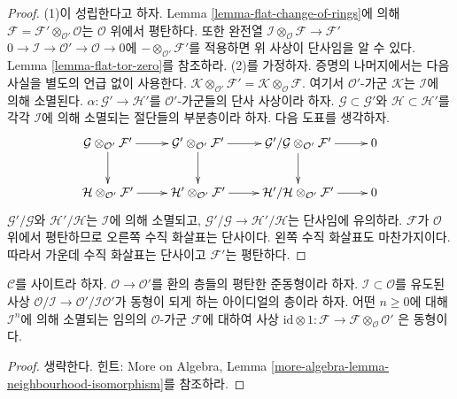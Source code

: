 \begin{proof}
(1)이 성립한다고 하자. Lemma \ref{lemma-flat-change-of-rings}에 의해
$\mathcal{F} = \mathcal{F}' \otimes_{\mathcal{O}'} \mathcal{O}$는
$\mathcal{O}$ 위에서 평탄하다. 또한 완전열
$\mathcal{I} \otimes_\mathcal{O} \mathcal{F} \to \mathcal{F}'$
$0 \to \mathcal{I} \to \mathcal{O}' \to \mathcal{O} \to 0$에
$- \otimes_{\mathcal{O}'} \mathcal{F}'$를 적용하면 위 사상이 단사임을
알 수 있다. Lemma \ref{lemma-flat-tor-zero}를 참조하라.
(2)를 가정하자. 증명의 나머지에서는 다음 사실을 별도의 언급 없이 사용한다.
$\mathcal{K} \otimes_{\mathcal{O}'} \mathcal{F}' =
\mathcal{K} \otimes_\mathcal{O} \mathcal{F}$.
여기서 $\mathcal{O}'$-가군 $\mathcal{K}$는 $\mathcal{I}$에 의해 소멸된다.
$\alpha : \mathcal{G}' \to \mathcal{H}'$를 $\mathcal{O}'$-가군들의 단사 사상이라
하자. $\mathcal{G} \subset \mathcal{G}'$와
$\mathcal{H} \subset \mathcal{H}'$를 각각 $\mathcal{I}$에 의해 소멸되는
절단들의 부분층이라 하자. 다음 도표를 생각하자.
$$
\xymatrix{
\mathcal{G} \otimes_{\mathcal{O}'} \mathcal{F}' \ar[r] \ar[d] &
\mathcal{G}' \otimes_{\mathcal{O}'} \mathcal{F}' \ar[r] \ar[d] &
\mathcal{G}'/\mathcal{G} \otimes_{\mathcal{O}'} \mathcal{F}' \ar[r] \ar[d] &
0 \\
\mathcal{H} \otimes_{\mathcal{O}'} \mathcal{F}' \ar[r] &
\mathcal{H}' \otimes_{\mathcal{O}'} \mathcal{F}' \ar[r] &
\mathcal{H}'/\mathcal{H} \otimes_{\mathcal{O}'} \mathcal{F}' \ar[r] & 0
}
$$
$\mathcal{G}'/\mathcal{G}$와 $\mathcal{H}'/\mathcal{H}$는
$\mathcal{I}$에 의해 소멸되고,
$\mathcal{G}'/\mathcal{G} \to \mathcal{H}'/\mathcal{H}$는 단사임에 유의하라.
$\mathcal{F}$가 $\mathcal{O}$ 위에서 평탄하므로 오른쪽 수직 화살표는
단사이다. 왼쪽 수직 화살표도 마찬가지이다. 따라서 가운데 수직 화살표는
단사이고 $\mathcal{F}'$는 평탄하다.
\end{proof}

\begin{lemma}
\label{lemma-neighbourhood-isomorphism}
$\mathcal{C}$를 사이트라 하자. $\mathcal{O} \to \mathcal{O}'$를 환의 층들의
평탄한 준동형이라 하자. $\mathcal{I} \subset \mathcal{O}$를 유도된 사상
$\mathcal{O}/\mathcal{I} \to \mathcal{O}'/\mathcal{I}\mathcal{O}'$가
동형이 되게 하는 아이디얼의 층이라 하자. 어떤 $n \geq 0$에 대해
$\mathcal{I}^n$에 의해 소멸되는 임의의 $\mathcal{O}$-가군 $\mathcal{F}$에
대하여 사상
$\text{id} \otimes 1 :
\mathcal{F} \to \mathcal{F} \otimes_\mathcal{O} \mathcal{O}'$
은 동형이다.
\end{lemma}

\begin{proof}
생략한다. 힌트: More on Algebra, Lemma
\ref{more-algebra-lemma-neighbourhood-isomorphism}를 참조하라.
\end{proof}





